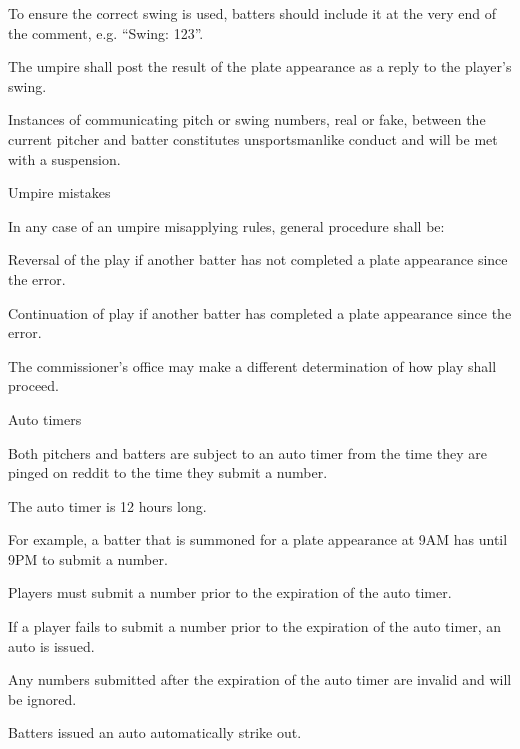 \begin{deepEnumerate}
\begin{deepEnumerate}
\begin{deepEnumerate}
			To ensure the correct swing is used, batters should include it at the very end of the comment, 
			e.g. “Swing: 123”.
		\end{deepEnumerate}
		\item The umpire shall post the result of the plate appearance as a reply to the player’s swing.
		\item Instances of communicating pitch or swing numbers, real or fake, 
		between the current pitcher and batter constitutes unsportsmanlike conduct and will be met with a suspension.
		\item Umpire mistakes
		\begin{deepEnumerate}
			\item In any case of an umpire misapplying rules, general procedure shall be:
			\begin{deepEnumerate}
				\item Reversal of the play if another batter has not completed a plate appearance since the error.
				\item Continuation of play if another batter has completed a plate appearance since the error.
			\end{deepEnumerate}
			\item The commissioner's office may make a different determination of how play shall proceed.
		\end{deepEnumerate}
	\end{deepEnumerate}
	\item Auto timers
	\begin{deepEnumerate}
		\item Both pitchers and batters are subject to an auto timer from the time they are pinged on reddit to the time they submit a number.
		\item The auto timer is 12 hours long.
		\begin{deepEnumerate}
			\item For example, a batter that is summoned for a plate appearance at 9AM has until 9PM to submit a number.
		\end{deepEnumerate}
		\item Players must submit a number prior to the expiration of the auto timer.
		\item If a player fails to submit a number prior to the expiration of the auto timer, an auto is issued.
		\begin{deepEnumerate}
			\item Any numbers submitted after the expiration of the auto timer are invalid and will be ignored.
			\item Batters issued an auto automatically strike out. 

\end{deepEnumerate}
\end{deepEnumerate}
\end{deepEnumerate}
